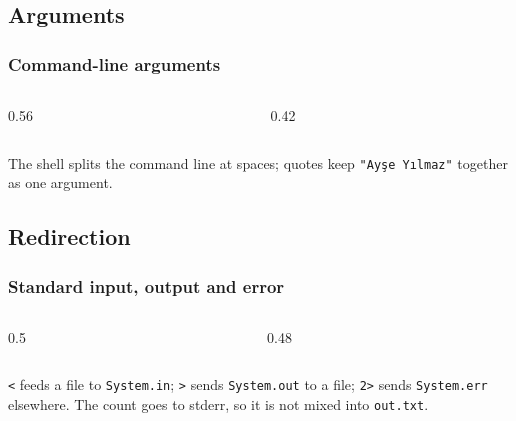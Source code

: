 \documentclass[aspectratio=169,10pt,compress]{beamer}
\begin{document}

\subsection[Args]{Arguments}




\begin{frame}[t,fragile] \frametitle{Command-line arguments}
  \begin{columns}[T]
    \begin{column}{0.56\textwidth}
    \end{column}
    \begin{column}{0.42\textwidth}
    \end{column}
  \end{columns}

  \vspace{0.2em}
  \small The shell splits the command line at spaces; quotes keep \texttt{"Ayşe Yılmaz"} together as one argument.
\end{frame}

\subsection[Streams]{Redirection}




\begin{frame}[t,fragile] \frametitle{Standard input, output and error}
  \begin{columns}[T]
    \begin{column}{0.5\textwidth}
    \end{column}
    \begin{column}{0.48\textwidth}
    \end{column}
  \end{columns}

  \vspace{0.2em}
  \small \texttt{<} feeds a file to \texttt{System.in}; \texttt{>} sends \texttt{System.out} to a file;
  \texttt{2>} sends \texttt{System.err} elsewhere. The count goes to stderr, so it is not mixed into \texttt{out.txt}.
\end{frame}
\end{document}
